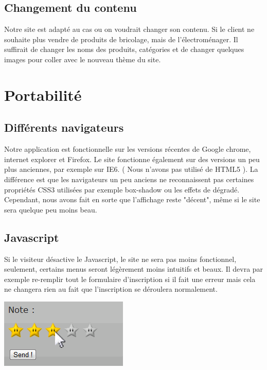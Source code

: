 \subsection{Changement du contenu}
	Notre site est adapté au cas ou on voudrait changer son contenu. Si le client ne souhaite plus vendre de produits de bricolage, mais de l'électroménager.
Il suffirait de changer les noms des produits, catégories et de changer quelques images pour coller avec le nouveau thème du site.	

	\section{Portabilité}

\subsection{Différents navigateurs}

	Notre application est fonctionnelle sur les versions récentes de Google chrome, internet explorer et Firefox. Le site fonctionne également sur des versions un peu plus anciennes, par exemple sur IE6. ( Nous n'avons pas utilisé de HTML5 ). La différence est que les navigateurs un peu anciens ne reconnaissent pas certaines propriétés CSS3 utilisées par exemple box-shadow ou les effets de dégradé. Cependant, nous avons fait en sorte que l'affichage reste "décent", même si le site sera quelque peu moins beau.

\subsection{Javascript}

	Si le visiteur désactive le Javascript, le site ne sera pas moins fonctionnel, seulement, certains menus seront légèrement moins intuitifs et beaux. Il devra par exemple re-remplir tout le formulaire d'inscription si il fait une erreur mais cela ne changera rien au fait que l'inscription se déroulera normalement.
	
\includegraphics[scale=1]{exemplejs.png}